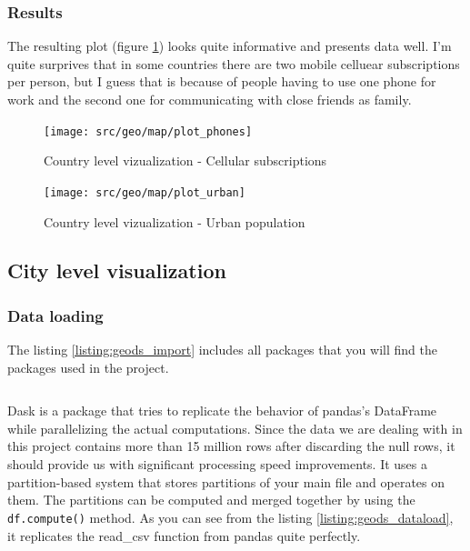 \documentclass[12pt, a4paper]{article}
\begin{document}
\subsubsection{Results}
The resulting plot (figure \ref{fig:geo_map}) looks quite informative and presents data well. I'm quite surprives that in some countries there are two mobile celluear subscriptions per person, but I guess that is because of people having to use one phone for work and the second one for communicating with close friends as family.

\begin{figure}[H]
    \centering
    \texttt{[image: src/geo/map/plot\_phones]}
    \caption{Country level vizualization - Cellular subscriptions}
    \label{fig:geo_map}
\end{figure}

\begin{figure}[H]
    \centering
    \texttt{[image: src/geo/map/plot\_urban]}
    \caption{Country level vizualization - Urban population}
    \label{fig:geo_map_urban}
\end{figure}

\subsection{City level visualization}

\subsubsection{Data loading}


The listing \ref{listing:geods_import} includes all packages that you will find the packages used in the project.

\bgroup
  \inputminted[linenos, breaklines=true, fontsize=\scriptsize]{python}{src/geo/ds/0_imports.py}
  \label{listing:geods_import}
\egroup


Dask is a package that tries to replicate the behavior of pandas's DataFrame while parallelizing the actual computations. Since the data we are dealing with in this project contains more than 15 million rows after discarding the null rows, it should provide us with significant processing speed improvements. It uses a partition-based system that stores partitions of your main file and operates on them. The partitions can be computed and merged together by using the \texttt{df.compute()} method. As you can see from the listing \ref{listing:geods_dataload}, it replicates the read\_csv function from pandas quite perfectly.
\end{document}

